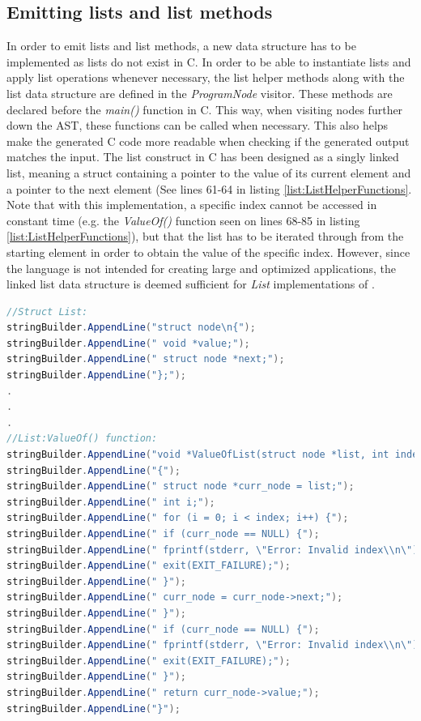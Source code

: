 \subsection{Emitting lists and list methods} \label{implement list}
In order to emit lists and list methods, a new data structure has to be implemented as lists do not exist in C. In order to be able to instantiate lists and apply list operations whenever necessary, the list helper methods along with the list data structure are defined in the \textit{ProgramNode} visitor. These methods are declared before the \textit{main()} function in C. This way, when visiting nodes further down the AST, these functions can be called when necessary. This also helps make the generated C code more readable when checking if the generated output matches the input. The list construct in C has been designed as a singly linked list, meaning a struct containing a pointer to the value of its current element and a pointer to the next element (See lines 61-64 in listing \ref{list:ListHelperFunctions}. Note that with this implementation, a specific index cannot be accessed in constant time (e.g. the \textit{ValueOf()} function seen on lines 68-85 in listing \ref{list:ListHelperFunctions}), but that the list has to be iterated through from the starting element in order to obtain the value of the specific index. However, since the language is not intended for creating large and optimized applications, the linked list data structure is deemed sufficient for \textit{List} implementations of \lang.

\begin{lstlisting}[language = csharp, firstnumber=60, label={list:ListHelperFunctions},caption=Emitting the code for the list implementation and ValueOf function - CobraCompiler/Emitter.cs]
//Struct List:
stringBuilder.AppendLine("struct node\n{");
stringBuilder.AppendLine(" void *value;");
stringBuilder.AppendLine(" struct node *next;");
stringBuilder.AppendLine("};");
.
.
.
//List:ValueOf() function:
stringBuilder.AppendLine("void *ValueOfList(struct node *list, int index)");
stringBuilder.AppendLine("{");
stringBuilder.AppendLine(" struct node *curr_node = list;");
stringBuilder.AppendLine(" int i;");
stringBuilder.AppendLine(" for (i = 0; i < index; i++) {");
stringBuilder.AppendLine(" if (curr_node == NULL) {");
stringBuilder.AppendLine(" fprintf(stderr, \"Error: Invalid index\\n\");");
stringBuilder.AppendLine(" exit(EXIT_FAILURE);");
stringBuilder.AppendLine(" }");
stringBuilder.AppendLine(" curr_node = curr_node->next;");
stringBuilder.AppendLine(" }");
stringBuilder.AppendLine(" if (curr_node == NULL) {");
stringBuilder.AppendLine(" fprintf(stderr, \"Error: Invalid index\\n\");");
stringBuilder.AppendLine(" exit(EXIT_FAILURE);");
stringBuilder.AppendLine(" }");
stringBuilder.AppendLine(" return curr_node->value;");
stringBuilder.AppendLine("}");
\end{lstlisting}

